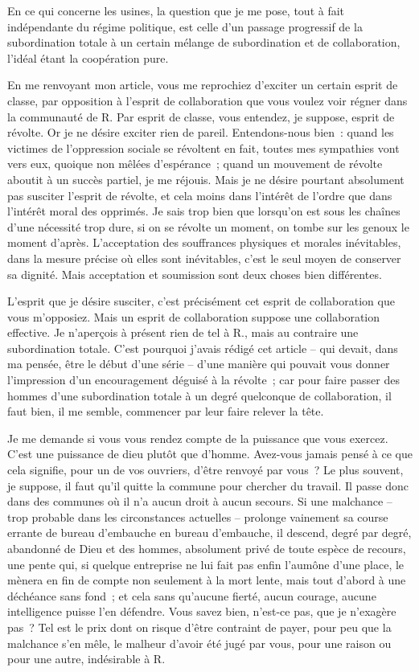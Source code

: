 \documentclass[french,twoside]{book} %
\begin{document}
En ce qui concerne les usines, la question que je me pose, tout à fait indépendante du régime politique, est celle d'un passage progressif de la subordination totale à un certain mélange de subordination et de collaboration, l'idéal étant la coopération pure.\par
En me renvoyant mon article, vous me reprochiez d'exciter un certain esprit de classe, par opposition à l'esprit de collaboration que vous voulez voir régner dans la communauté de R. Par esprit de classe, vous entendez, je suppose, esprit de révolte. Or je ne désire exciter rien de pareil. Entendons-nous bien : quand les victimes de l'oppression sociale se révoltent en fait, toutes mes sympathies vont vers eux, quoique non mêlées d'espérance ; quand un mouvement de révolte aboutit à un succès partiel, je me réjouis. Mais je ne désire pourtant absolument pas susciter l'esprit de révolte, et cela moins dans l'intérêt de l'ordre que dans l'intérêt moral des opprimés. Je sais trop bien que lorsqu'on est sous les chaînes d'une nécessité trop dure, si on se révolte un moment, on tombe sur les genoux le moment d'après. L'acceptation des souffrances physiques et morales inévitables, dans la mesure précise où elles sont inévitables, c'est le seul moyen de conserver sa dignité. Mais acceptation et soumission sont deux choses bien différentes.\par
L'esprit que je désire susciter, c'est précisément cet esprit de collaboration que vous m'opposiez. Mais un esprit de collaboration suppose une collaboration effective. Je n'aperçois à présent rien de tel à R., mais au contraire une subordination totale. C'est pourquoi j'avais rédigé cet article – qui devait, dans ma pensée, être le début d'une série – d'une manière qui pouvait vous donner l'impression d'un encouragement déguisé à la révolte ; car pour faire passer des hommes d'une subordination totale à un degré quelconque de collaboration, il faut bien, il me semble, commencer par leur faire relever la tête.\par
Je me demande si vous vous rendez compte de la puissance que vous exercez. C'est une puissance de dieu plutôt que d'homme. Avez-vous jamais pensé à ce que cela signifie, pour un de vos ouvriers, d'être renvoyé par vous ? Le plus souvent, je suppose, il faut qu'il quitte la commune pour chercher du travail. Il passe donc dans des communes où il n'a aucun droit à aucun secours. Si une malchance – trop probable dans les circonstances actuelles – prolonge vainement sa course errante de bureau d'embauche en bureau d'embauche, il descend, degré par degré, abandonné de Dieu et des hommes, absolument privé de toute espèce de recours, une pente qui, si quelque entreprise ne lui fait pas enfin l'aumône d'une place, le mènera en fin de compte non seulement à la mort lente, mais tout d'abord à une déchéance sans fond ; et cela sans qu'aucune fierté, aucun courage, aucune intelligence puisse l'en défendre. Vous savez bien, n'est-ce pas, que je n'exagère pas ? Tel est le prix dont on risque d'être contraint de payer, pour peu que la malchance s'en mêle, le malheur d'avoir été jugé par vous, pour une raison ou pour une autre, indésirable à R.\par
\end{document}
